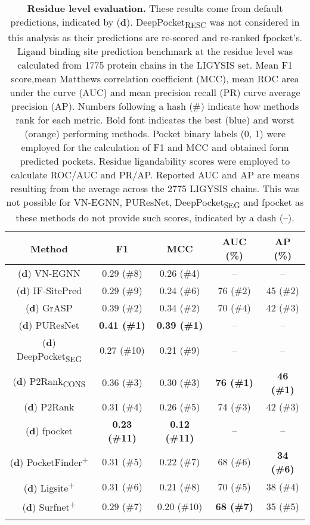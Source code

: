\begin{longtable}[c]{|c|c|c|c|c|}
\hline
\textbf{Method}         & \textbf{F1}   & \textbf{MCC}  & \textbf{AUC} (\%)  & \textbf{AP} (\%)   \\ \hline
\endfirsthead
%
\footnotesize{(\textbf{d})} VN-EGNN        & 0.29 (\#8) & 0.26 (\#4) & --    & --    \\ \hline
\footnotesize{(\textbf{d})} IF-SitePred    & 0.29 (\#9) & 0.24 (\#6) & 76 (\#2)  & 45 (\#2) \\ \hline
\footnotesize{(\textbf{d})} GrASP          & 0.39 (\#2) & 0.34 (\#2) & 70 (\#4) & 42 (\#3) \\ \hline
\footnotesize{(\textbf{d})} PUResNet       & \textbf{\textcolor{CBBlue}{0.41 (\#1)}} & \textbf{\textcolor{CBBlue}{0.39 (\#1)}} & --    & --    \\ \hline
\footnotesize{(\textbf{d})} DeepPocket\textsubscript{SEG}  & 0.27 (\#10) & 0.21 (\#9) & --    & --    \\ \hline
\footnotesize{(\textbf{d})} P2Rank\textsubscript{CONS}     & 0.36 (\#3) & 0.30 (\#3)  & \textbf{\textcolor{CBBlue}{76 (\#1)}} & \textbf{\textcolor{CBBlue}{46 (\#1)}} \\ \hline
\footnotesize{(\textbf{d})} P2Rank         & 0.31 (\#4) & 0.26 (\#5) & 74 (\#3) & 42 (\#3) \\ \hline
\footnotesize{(\textbf{d})} fpocket        & \textbf{\textcolor{CBOrange}{0.23 (\#11)}} & \textbf{\textcolor{CBOrange}{0.12 (\#11)}} & --    & --    \\ \hline
\footnotesize{(\textbf{d})} PocketFinder\textsuperscript{+}  & 0.31 (\#5) & 0.22 (\#7) & 68 (\#6) & \textbf{\textcolor{CBOrange}{34 (\#6)}} \\ \hline
\footnotesize{(\textbf{d})} Ligsite\textsuperscript{+}       & 0.31 (\#6) & 0.21 (\#8) & 70 (\#5) & 38 (\#4) \\ \hline
\footnotesize{(\textbf{d})} Surfnet\textsuperscript{+}       & 0.29 (\#7) & 0.20 (\#10)  & \textbf{\textcolor{CBOrange}{68 (\#7)}} & 35 (\#5) \\ \hline
\caption[Residue level evaluation]{\textbf{Residue level evaluation.} These results come from default predictions, indicated by (\textbf{d}). DeepPocket\textsubscript{RESC} was not considered in this analysis as their predictions are re-scored and re-ranked fpocket's. Ligand binding site prediction benchmark at the residue level was calculated from 1775 protein chains in the LIGYSIS set. Mean F1 score,mean Matthews correlation coefficient (MCC), mean ROC area under the curve (AUC) and mean precision recall (PR) curve average precision (AP). Numbers following a hash (\#) indicate how methods rank for each metric. Bold font indicates the best (blue) and worst (orange) performing methods. Pocket binary labels (0, 1) were employed for the calculation of F1 and MCC and obtained form predicted pockets. Residue ligandability scores were employed to calculate ROC/AUC and PR/AP. Reported AUC and AP are means resulting from the average across the 2775 LIGYSIS chains. This was not possible for VN-EGNN, PUResNet, DeepPocket\textsubscript{SEG} and fpocket as these methods do not provide such scores, indicated by a dash (--).}

\end{longtable}
